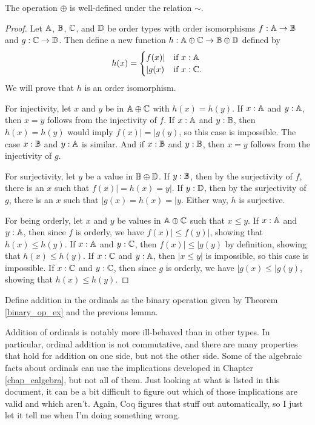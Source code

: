 \documentclass[../../math.tex]{subfiles}
\begin{document}
\begin{lemma}
    The operation $\oplus$ is well-defined under the relation $\sim$.
\end{lemma}
\begin{proof}
    Let $\mathbb{A}$, $\mathbb{B}$, $\mathbb{C}$, and $\mathbb{D}$ be order types with order isomorphisms $f :
    \mathbb{A} \to \mathbb{B}$ and $g : \mathbb{C} \to \mathbb{D}$.  Then define a new function $h : \mathbb{A} \oplus
    \mathbb{C} \to \mathbb{B} \oplus \mathbb{D}$ defined by
    \[
        h(x) =
        \begin{cases}
            f(x)| &\text{if $x : \mathbb{A}$} \\
            |g(x) &\text{if $x : \mathbb{C}$.}
        \end{cases}
    \]
    We will prove that $h$ is an order isomorphism.

    For injectivity, let $x$ and $y$ be in $\mathbb{A} \oplus \mathbb{C}$ with $h(x) = h(y)$.
    If $x : \mathbb{A}$ and $y : \mathbb{A}$, then $x = y$ follows from the injectivity of $f$.
    If $x : \mathbb{A}$ and $y : \mathbb{B}$, then $h(x) = h(y)$ would imply $f(x)| = |g(y)$, so
    this case is impossible.  The case $x : \mathbb{B}$ and $y : \mathbb{A}$ is similar.  And if
    $x : \mathbb{B}$ and $y : \mathbb{B}$, then $x = y$ follows from the injectivity of $g$.

    For surjectivity, let $y$ be a value in $\mathbb{B} \oplus \mathbb{D}$.  If $y : \mathbb{B}$, then
    by the surjectivity of $f$, there is an $x$ such that $f(x)| = h(x) = y|$.
    If $y : \mathbb{D}$, then by the surjectivity of $g$, there is an $x$ such that
    $|g(x) = h(x) = |y$.  Either way, $h$ is surjective.

    For being orderly, let $x$ and $y$ be values in $\mathbb{A} \oplus \mathbb{C}$ such that $x
    \leq y$.  If $x : \mathbb{A}$ and $y : \mathbb{A}$, then since $f$ is orderly, we have
    $f(x)| \leq f(y)|$, showing that $h(x) \leq h(y)$.  If $x : \mathbb{A}$ and $y :
    \mathbb{C}$, then $f(x)| \leq |g(y)$ by definition, showing that $h(x) \leq h(y)$.
    If $x : \mathbb{C}$ and $y : \mathbb{A}$, then $|x \leq y|$ is impossible, so this case is
    impossible.  If $x : \mathbb{C}$ and $y : \mathbb{C}$, then since $g$ is orderly, we have
    $|g(x) \leq |g(y)$, showing that $h(x) \leq h(y)$.
\end{proof}

\begin{instance}
    Define addition in the ordinals as the binary operation given by Theorem
    \ref{binary_op_ex} and the previous lemma.
\end{instance}

Addition of ordinals is notably more ill-behaved than in other types.  In
particular, ordinal addition is not commutative, and there are many properties
that hold for addition on one side, but not the other side.  Some of the
algebraic facts about ordinals can use the implications developed in Chapter
\ref{chap_ealgebra}, but not all of them.  Just looking at what is listed in
this document, it can be a bit difficult to figure out which of those
implications are valid and which aren't.  Again, Coq figures that stuff out
automatically, so I just let it tell me when I'm doing something wrong.
\end{document}
